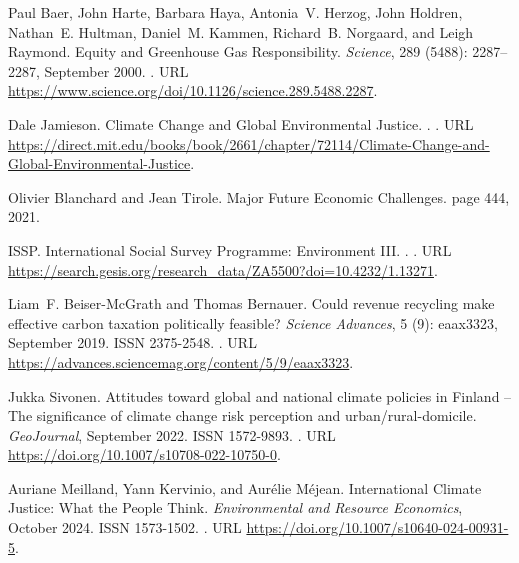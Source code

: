 \begin{thebibliography}{55}
  Paul Baer, John Harte, Barbara Haya, Antonia~V. Herzog, John Holdren, Nathan~E.
    Hultman, Daniel~M. Kammen, Richard~B. Norgaard, and Leigh Raymond.
  \newblock Equity and {{Greenhouse Gas Responsibility}}.
  \newblock \emph{Science}, 289 (5488): 2287--2287, September
    2000.
  \newblock {}.
  \newblock URL \url{https://www.science.org/doi/10.1126/science.289.5488.2287}.
  
  Dale Jamieson.
  \newblock Climate {{Change}} and {{Global Environmental Justice}}.
  .
  \newblock {}.
  \newblock URL
    \url{https://direct.mit.edu/books/book/2661/chapter/72114/Climate-Change-and-Global-Environmental-Justice}.
  
  Olivier Blanchard and Jean Tirole.
  \newblock Major {{Future Economic Challenges}}.
  \newblock page 444, 2021.
  
  ISSP.
  \newblock International {{Social Survey Programme}}: {{Environment III}}.
  .
  \newblock {}.
  \newblock URL
    \url{https://search.gesis.org/research\_data/ZA5500?doi=10.4232/1.13271}.
  
  Liam~F. {Beiser-McGrath} and Thomas Bernauer.
  \newblock Could revenue recycling make effective carbon taxation politically
    feasible?
  \newblock \emph{Science Advances}, 5 (9): eaax3323, September
    2019.
  \newblock ISSN 2375-2548.
  \newblock {}.
  \newblock URL \url{https://advances.sciencemag.org/content/5/9/eaax3323}.
  
  Jukka Sivonen.
  \newblock Attitudes toward global and national climate policies in {{Finland}}
    -- {{The}} significance of climate change risk perception and
    urban/rural-domicile.
  \newblock \emph{GeoJournal}, September 2022.
  \newblock ISSN 1572-9893.
  \newblock {}.
  \newblock URL \url{https://doi.org/10.1007/s10708-022-10750-0}.
  
  Auriane Meilland, Yann Kervinio, and Aur{\'e}lie M{\'e}jean.
  \newblock International {{Climate Justice}}: {{What}} the {{People Think}}.
  \newblock \emph{Environmental and Resource Economics}, October 2024.
  \newblock ISSN 1573-1502.
  \newblock {}.
  \newblock URL \url{https://doi.org/10.1007/s10640-024-00931-5}.
  

\end{thebibliography}
